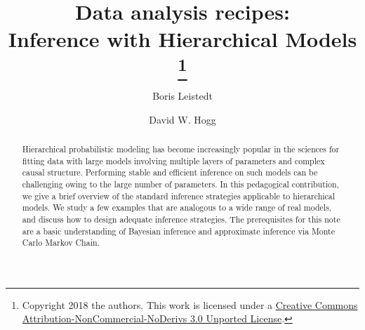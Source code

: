 \documentclass[modern]{aastex61}
\newcommand{\note}[1]{\footnote{#1}}
\begin{document}
\sloppy\sloppypar\raggedbottom\frenchspacing\thispagestyle{plain}%
%
\title{Data analysis recipes:\\
       Inference with Hierarchical Models%
\note{\label{note:first}%
Copyright 2018 the authors.
        This work is licensed under a
        \href{http://creativecommons.org/licenses/by-nc-nd/3.0/deed.en\_US}{%
            Creative Commons Attribution-NonCommercial-NoDerivs 3.0 Unported
            License}.}}%


\author[0000-0002-3962-9274]{Boris Leistedt}

\author[0000-0003-2866-9403]{David W. Hogg}


\begin{abstract}\noindent
Hierarchical probabilistic modeling has become increasingly popular in the sciences for fitting data with large models involving multiple layers of parameters and complex causal structure.  
Performing stable and efficient inference on such models can be challenging owing to the large number of parameters.
In this pedagogical contribution, we give a brief overview of the standard inference strategies applicable to hierarchical models.
We study a few examples that are analogous to a wide range of real models, and discuss how to design adequate inference strategies. 
The prerequisites for this note are a basic understanding of Bayesian inference and approximate inference via Monte Carlo Markov Chain.
\end{abstract}


\end{document}
